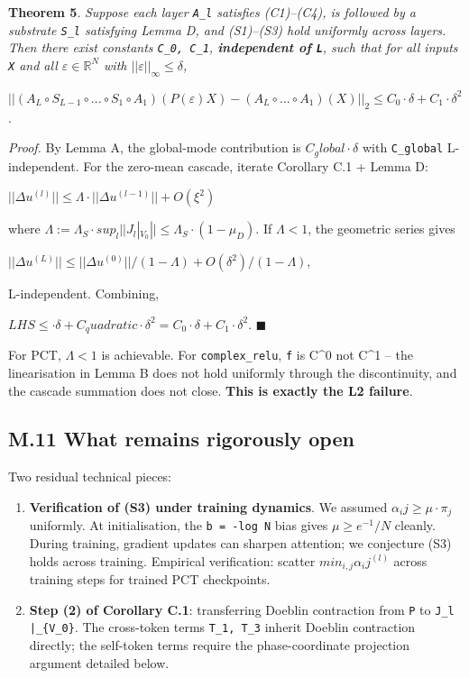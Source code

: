 \documentclass[11pt,a4paper]{article}
\theoremstyle{plain}
\theoremstyle{definition}
\begin{document}
\textbf{Theorem 5}. \emph{Suppose each layer \texttt{A\_l} satisfies (C1)--(C4), is followed by a substrate \texttt{S\_l} satisfying Lemma D, and (S1)--(S3) hold uniformly across layers. Then there exist constants \texttt{C\_0, C\_1}, \textbf{independent of \texttt{L}}, such that for all inputs \texttt{X} and all $\varepsilon  \in  \mathbb{R}^N$ with $||\varepsilon ||_\infty  \le  \delta $,}

$||(A_L \circ  S_{L-1} \circ  ... \circ  S_1 \circ  A_1)(P(\varepsilon )X) - (A_L \circ  ... \circ  A_1)(X)||_2 \le  C_0 \cdot  \delta  + C_1 \cdot  \delta ^2$.

\emph{Proof.} By Lemma A, the global-mode contribution is $C_global \cdot  \delta $ with \texttt{C\_global} L-independent. For the zero-mean cascade, iterate Corollary C.1 + Lemma D:

$||\Delta u^{(l)}|| \le  \Lambda  \cdot  ||\Delta u^{(l-1)}|| + O(\xi ^2)$

where $\Lambda  := \Lambda _S \cdot  sup_l ||J_l|_{V_0}|| \le  \Lambda _S \cdot  (1 - \mu _D)$. If $\Lambda  < 1$, the geometric series gives

$||\Delta u^{(L)}|| \le  ||\Delta u^{(0)}|| / (1 - \Lambda ) + O(\delta ^2) / (1 - \Lambda )$,

L-independent. Combining,

$LHS \le  \cdot  \delta  + C_quadratic \cdot  \delta ^2 = C_0 \cdot  \delta  + C_1 \cdot  \delta ^2$. $\blacksquare$

For PCT, $\Lambda  < 1$ is achievable. For \texttt{complex\_relu}, \texttt{f} is C\textasciicircum{}0 not C\textasciicircum{}1 -- the linearisation in Lemma B does not hold uniformly through the discontinuity, and the cascade summation does not close. \textbf{This is exactly the L2 failure}.

\subsection{M.11 What remains rigorously open}
Two residual technical pieces:

\begin{enumerate}
  \item \textbf{Verification of (S3) under training dynamics}. We assumed $\alpha _ij \ge  \mu  \cdot  \pi _j$ uniformly. At initialisation, the \texttt{b = -log N} bias gives $\mu  \ge  e^{-1}/N$ cleanly. During training, gradient updates can sharpen attention; we conjecture (S3) holds across training. Empirical verification: scatter $min_{i,j} \alpha _ij^{(l)}$ across training steps for trained PCT checkpoints.
  \item \textbf{Step (2) of Corollary C.1}: transferring Doeblin contraction from \texttt{P} to \texttt{J\_l |\_\{V\_0\}}. The cross-token terms \texttt{T\_1, T\_3} inherit Doeblin contraction directly; the self-token terms require the phase-coordinate projection argument detailed below.
\end{enumerate}
\end{document}
